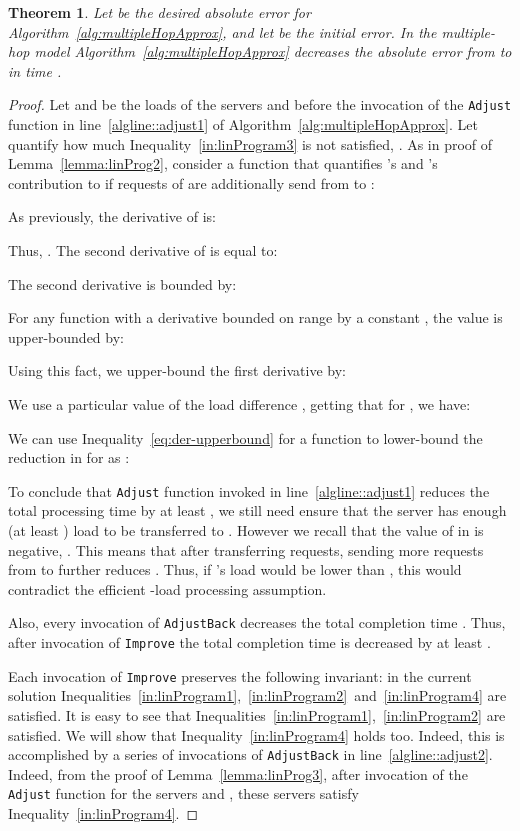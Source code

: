 \documentclass[11pt]{article}
\newtheorem{theorem}{Theorem}
\begin{document}
\begin{theorem}\label{thm:approxQuality}
Let  be the desired absolute error for Algorithm~\ref{alg:multipleHopApprox}, and let  be the initial error. In the multiple-hop model Algorithm~\ref{alg:multipleHopApprox} decreases the absolute error from  to  in time .
\end{theorem}
\begin{proof}
Let  and  be the loads of the servers  and  before the invocation of the \texttt{Adjust} function in line~\ref{algline::adjust1} of Algorithm~\ref{alg:multipleHopApprox}.
Let  quantify how much Inequality~\ref{in:linProgram3} is not satisfied, .
As in proof of Lemma~\ref{lemma:linProg2}, consider a function  that quantifies 's and 's contribution to  if  requests of are additionally send from  to :

As previously, the derivative of  is:

Thus, .
The second derivative of  is equal to:

The second derivative is bounded by:

For any function  with a derivative  bounded on range  by a constant , the value  is upper-bounded by:

Using this fact, we upper-bound the first derivative by:

We use a particular value of the load difference , getting that for , we have: 


We can use Inequality~\ref{eq:der-upperbound} for a function  to lower-bound the reduction in  for  as :




To conclude that \texttt{Adjust} function invoked in line~\ref{algline::adjust1} reduces the total processing time by at least , we still need ensure that the server  has enough (at least ) load to be transferred to . However we recall that the value of  in  is negative, . This means that after transferring  requests, sending more requests from  to  further reduces .
Thus, if 's load would be lower than , this would contradict the efficient -load processing assumption.



Also, every invocation of \texttt{AdjustBack} decreases the total completion time . Thus,  after invocation of \texttt{Improve} the total completion time  is decreased by at least .

Each invocation of \texttt{Improve} preserves the following invariant: in the current solution Inequalities~\ref{in:linProgram1},~\ref{in:linProgram2}~and~\ref{in:linProgram4} are satisfied. It is easy to see that Inequalities~\ref{in:linProgram1},~\ref{in:linProgram2} are satisfied. We will show that Inequality~\ref{in:linProgram4} holds too. Indeed, this is accomplished by a series of invocations of \texttt{AdjustBack} in line~\ref{algline::adjust2}. Indeed, from the proof of Lemma~\ref{lemma:linProg3}, after invocation of the \texttt{Adjust} function for the servers  and , these servers satisfy Inequality~\ref{in:linProgram4}. 


\end{proof}
\end{document}
